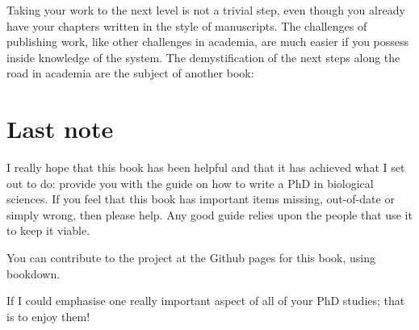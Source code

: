 \documentclass[
]{krantz}
\begin{document}
Taking your work to the next level is not a trivial step, even though you already have your chapters written in the style of manuscripts. The challenges of publishing work, like other challenges in academia, are much easier if you possess inside knowledge of the system. The demystification of the next steps along the road in academia are the subject of another book:

\hypertarget{lastnote}{%
\chapter*{Last note}\label{lastnote}}


I really hope that this book has been helpful and that it has achieved what I set out to do: provide you with the guide on how to write a PhD in biological sciences. If you feel that this book has important items missing, out-of-date or simply wrong, then please help. Any good guide relies upon the people that use it to keep it viable.

You can contribute to the project at the Github pages for this book, using bookdown.

If I could emphasise one really important aspect of all of your PhD studies; that is to enjoy them!

  

\backmatter
\printindex
\end{document}
